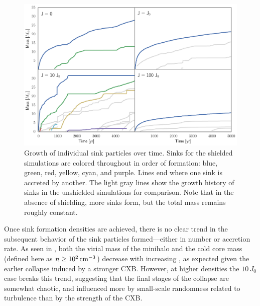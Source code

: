 \documentclass[../thesis.tex]{subfiles}
\begin{document}
\begin{figure}
  \begin{center}
    \includegraphics[width=\columnwidth]{figures/sinks/sink_masses}
    \caption{Growth of individual sink particles over time. Sinks for the shielded simulations are colored throughout in order of formation: blue, green, red, yellow,  cyan, and purple. Lines end where one sink is accreted by another.  The light gray lines show the growth history of sinks in the unshielded simulations for comparison. Note that in the absence of shielding, more sinks form, but the total mass remains roughly constant.}
    \label{sinkmasses}
  \end{center}
\end{figure}

 Once sink formation densities are achieved, there is no clear trend in the subsequent behavior of the sink particles formed---either in number or accretion rate.  As seen in , both the virial mass of the minihalo and the cold core mass (defined here as $n\geq10^2\,\mathrm{cm}^{-3}$) decrease with increasing \jxr, as expected given the earlier collapse induced by a stronger CXB.  However, at higher densities the $10\,J_0$ case breaks this trend, suggesting that the final stages of the collapse are somewhat chaotic, and influenced more by small-scale randomness related to turbulence than by the strength of the CXB.
\end{document}
